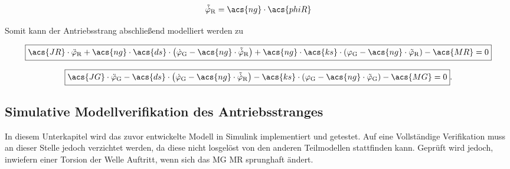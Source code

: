 \begin{align}
    \tilde{\dot\varphi}_{\mathrm{R}} = \acs{ng} \cdot \acs{phiR}
    \label{eq:Gleichung4.8}
\end{align}

Somit kann der Antriebsstrang abschließend modelliert werden zu

\begin{equation}
    \label{eq:Gleichung4.9}
   \boxed{\acs{JR} \cdot \ddot{\varphi}_{\mathrm{R}} + \acs{ng} \cdot \acs{ds} \cdot \left( \dot\varphi_{\mathrm{G}} - \acs{ng} \cdot \tilde{\dot\varphi}_{\mathrm{R}}\right) + \acs{ng} \cdot \acs{ks} \cdot \left( \varphi_{\mathrm{G}} - \acs{ng} \cdot \tilde{\varphi}_{\mathrm{R}}\right) - \acs{MR} = 0}
\end{equation}

\begin{equation}
   \label{eq:Gleichung4.10}
   \boxed{\acs{JG} \cdot \ddot{\varphi}_{\mathrm{G}} - \acs{ds} \cdot \left( \dot\varphi_{\mathrm{G}} - \acs{ng} \cdot \tilde{\dot\varphi}_{\mathrm{R}}\right) - \acs{ks} \cdot \left( \varphi_{\mathrm{G}} - \acs{ng} \cdot \tilde{\varphi}_{\mathrm{G}}\right) - \acs{MG} = 0}.
\end{equation}

\subsection{Simulative Modellverifikation des Antriebsstranges}

In diesem Unterkapitel wird das zuvor entwickelte Modell in Simulink implementiert und getestet. Auf eine Vollständige Verifikation muss an dieser Stelle jedoch verzichtet werden, da diese nicht losgelöst von den anderen Teilmodellen stattfinden kann. Geprüft wird jedoch, inwiefern einer Torsion der Welle Auftritt, wenn sich das \acl{MG} \bzw \acl{MR} sprunghaft ändert.


